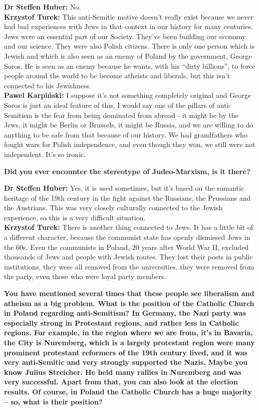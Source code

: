 \textbf{Dr Steffen Huber:} No.\\ 
\textbf{Krzystof Turek:} This anti-Semitic motive doesn’t really exist because we never had bad experiences with Jews in that context in our history for many centuries. Jews were an essential part of our Society. They've been building our economy and our science. They were also Polish citizens. There is only one person which is Jewish and which is also seen as an enemy of Poland by the government, George Soros. He is seen as an enemy because he wants, with his “dirty billions”, to force people around the world to be become atheists and liberals, but this isn’t connected to his Jewishness.\\ 
\textbf{Pawel Karpiński:} I suppose it's not something completely original and George Soros is just an ideal feature of this. I would say one of the pillars of anti-Semitism is the fear from being dominated from abroad - it might be by the Jews, it might be Berlin or Brussels, it might be Russia, and we are willing to do anything to be safe from that because of our history. We had grandfathers who fought wars for Polish independence, and even though they won, we still were not independent. It's so ironic.  

\textbf{Did you ever encounter the stereotype of Judeo-Marxism, is it there?} 

\textbf{Dr Steffen Huber:} Yes, it is used sometimes, but it's based on the romantic heritage of the 19th century in the fight against the Russians, the Prussians and the Austrians. This was very closely culturally connected to the Jewish experience, so this is a very difficult situation.\\ 
\textbf{Krzystof Turek:} There is another thing connected to Jews. It has a little bit of a different character, because the communist state has openly dismissed Jews in the 60s. Even the communists in Poland, 20 years after World War II, excluded thousands of Jews and people with Jewish routes. They lost their posts in public institutions, they were all removed from the universities, they were removed from the party, even those who were loyal party members. 

\textbf{You have mentioned several times that these people see liberalism and atheism as a big problem. What is the position of the Catholic Church in Poland regarding anti-Semitism? In Germany, the Nazi party was especially strong in Protestant regions, and rather less in Catholic regions. For example, in the region where we are from, it's in Bavaria, the City is Nuremberg, which is a largely protestant region were many prominent protestant reformers of the 19th century lived, and it was very anti-Semitic and very strongly supported the Nazis. Maybe you know Julius Streicher. He held many rallies in Nuremberg and was very successful. Apart from that, you can also look at the election results. Of course, in Poland the Catholic Church has a huge majority – so, what is their position?} 

